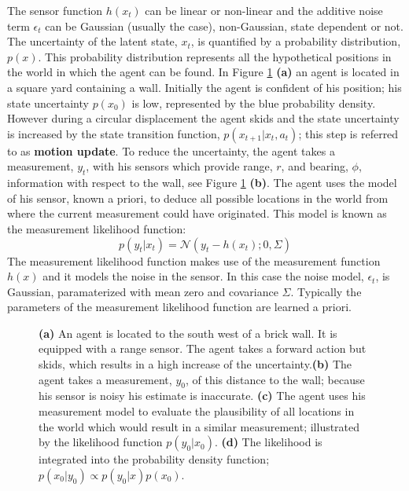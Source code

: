 The sensor function $h(x_t)$ can be linear or non-linear and the additive noise term $\epsilon_t$ can 
be Gaussian (usually the case), non-Gaussian, state dependent or not. The uncertainty of the latent state, $x_t$, is quantified by a probability distribution, $p(x)$. 
This probability distribution represents all the hypothetical positions in the world in which the agent can be found. In Figure \ref{fig:belief_update_example} \textbf{(a)} an agent is located in a square yard 
containing a wall. Initially the agent is confident of his position; his state uncertainty $p(x_0)$ is low, represented 
by the blue probability density. However during a circular displacement the agent skids and the state uncertainty is increased 
by the state transition function, $p(x_{t+1}|x_t,a_t)$; this step is referred to as \textbf{motion update}. To reduce the uncertainty, the agent takes a measurement, $y_t$, with 
his sensors which provide range, $r$, and bearing, $\phi$, information with respect to the wall, see Figure \ref{fig:belief_update_example} \textbf{(b)}.
The agent uses the model of his sensor, known a priori, to deduce all possible locations in the world from where the current 
measurement could have originated. This model is known as the measurement likelihood function: 
\begin{equation}\label{eq:likelihood}
 p(y_t|x_t) = \mathcal{N}(y_t - h(x_t);0,\Sigma)
\end{equation}
The measurement likelihood function makes use of the measurement function $h(x)$ and it models the noise 
in the sensor. In this case the noise model, $\epsilon_t$, is Gaussian, paramaterized with mean zero and covariance $\Sigma$.
Typically the parameters of the measurement likelihood function are learned a priori.

\begin{figure}
  \centering
 \caption{\textbf{(a)} An agent is located to the south west of a brick wall. It is equipped with a 
  range sensor. The agent takes a forward action but skids, which results in a high increase of the uncertainty.\textbf{(b)} 
  The agent takes a measurement, $y_0$, of this distance to the wall; because his sensor is noisy his estimate is inaccurate. 
  \textbf{(c)} The agent uses his measurement model to evaluate the plausibility of all locations in the world which would result in a similar
  measurement; illustrated by the likelihood function $p(y_0|x_0)$. \textbf{(d)} The likelihood is integrated into the probability 
  density function; $p(x_0|y_0) \propto p(y_0|x)p(x_0)$.}
  \label{fig:belief_update_example}
\end{figure}

